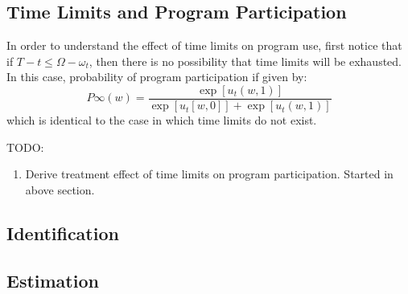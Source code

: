 \documentclass[12pt]{article}
\numberwithin{equation}{section}
\numberwithin{figure}{section}
\numberwithin{table}{section}
\begin{document}
\subsection{Time Limits and Program Participation}
In order to understand the effect of time limits on program use, first notice that if $T-t\leq\Omega-\omega_t$, then there is no possibility that time limits will be exhausted. In this case, probability of program participation if given by:
\[P\infty(w) = \frac{\exp[u_t(w,1)]}{\exp[u_t[w,0]]+\exp[u_t(w,1)]} \]
which is identical to the case in which time limits do not exist.



{\color{red}TODO:
\begin{enumerate}
\item Derive treatment effect of time limits on program participation. Started in above section.
\end{enumerate}
}

\subsection{Identification}

\subsection{Estimation}


%
%

\end{document}

